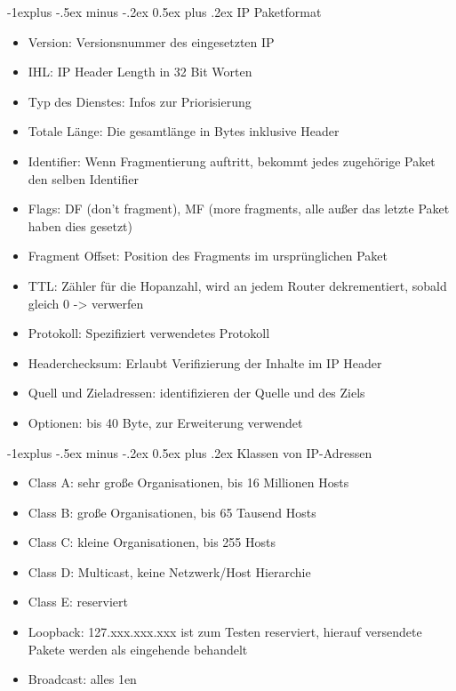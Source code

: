 \documentclass[10pt,landscape]{article}
\makeatletter
\renewcommand{\subsection}{\@startsection{subsection}{2}{0mm}%
                                {-1explus -.5ex minus -.2ex}%
                                {0.5ex plus .2ex}%
                                {\normalfont\normalsize\bfseries}}
\makeatother
\begin{document}
\begin{multicols}{3}
\subsection{IP Paketformat}
\begin{itemize}
    \item Version: Versionsnummer des eingesetzten IP
    \item IHL: IP Header Length in 32 Bit Worten
    \item Typ des Dienstes: Infos zur Priorisierung
    \item Totale Länge: Die gesamtlänge in Bytes inklusive Header
    \item Identifier: Wenn Fragmentierung auftritt, bekommt jedes zugehörige Paket den selben Identifier
    \item Flags: DF (don't fragment), MF (more fragments, alle außer das letzte Paket haben dies gesetzt)
    \item Fragment Offset: Position des Fragments im ursprünglichen Paket
    \item TTL: Zähler für die Hopanzahl, wird an jedem Router dekrementiert, sobald gleich 0 -> verwerfen
    \item Protokoll: Spezifiziert verwendetes Protokoll
    \item Headerchecksum: Erlaubt Verifizierung der Inhalte im IP Header
    \item Quell und Zieladressen: identifizieren der Quelle und des Ziels
    \item Optionen: bis 40 Byte, zur Erweiterung verwendet
\end{itemize}

\subsection{Klassen von IP-Adressen}
\begin{itemize}
    \item Class A: sehr große Organisationen, bis 16 Millionen Hosts
    \item Class B: große Organisationen, bis 65 Tausend Hosts
    \item Class C: kleine Organisationen, bis 255 Hosts
    \item Class D: Multicast, keine Netzwerk/Host Hierarchie
    \item Class E: reserviert
    \item Loopback: 127.xxx.xxx.xxx ist zum Testen reserviert, hierauf versendete Pakete werden als eingehende behandelt
    \item Broadcast: alles 1en
\end{itemize}


\end{multicols}
\end{document}
